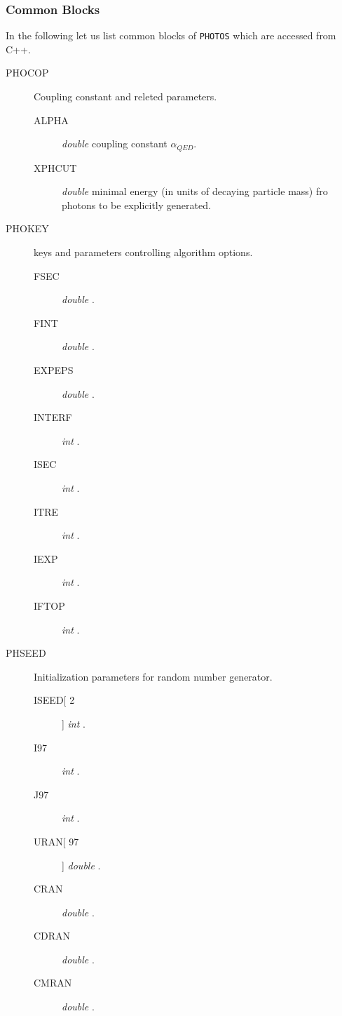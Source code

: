 \documentclass[]{Photos_interface_design}
\begin{document}
\subsubsection{Common Blocks}

In the following let us list common blocks of {\tt PHOTOS} which are accessed
from C++.

\begin{description}
\item[PHOCOP] Coupling constant and releted parameters.
    \begin{description}
	\item[ALPHA]  \textit{double}  coupling constant $\alpha_{QED}$.
	\item[XPHCUT] \textit{double} minimal energy (in units of decaying particle mass) fro photons to be explicitly generated.
    \end{description}
\end{description}

\begin{description}
\item[PHOKEY] keys and parameters controlling algorithm options.
    \begin{description}
	\item[FSEC]   \textit{double} .
	\item[FINT]   \textit{double} .
	\item[EXPEPS] \textit{double} .
	\item[INTERF] \textit{int} .
	\item[ISEC]   \textit{int} .
	\item[ITRE]   \textit{int} .
	\item[IEXP]   \textit{int} .
	\item[IFTOP]  \textit{int} .
    \end{description}
\end{description}

\begin{description}
\item[PHSEED] Initialization parameters for random number generator.
    \begin{description}
	\item[ISEED[ 2]]  \textit{int} .
	\item[I97]        \textit{int} .
	\item[J97]        \textit{int} .
	\item[URAN[ 97]]  \textit{double} .
	\item[CRAN]       \textit{double} .
	\item[CDRAN]      \textit{double} .
	\item[CMRAN]      \textit{double} .
    \end{description}
\end{description}
\end{document}
